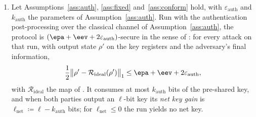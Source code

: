 \begin{corollary}
\begin{enumerate}[label=(\roman*),leftmargin=2.4em]
\item Let Assumptions~\ref{ass:auth}, \ref{ass:fixed}
  and~\ref{ass:conform} hold, with $\varepsilon_{\mathrm{auth}}$ and
  $k_{\mathrm{auth}}$ the parameters of Assumption~\ref{ass:auth}. Run with
  the authentication post-processing over the classical channel of
  Assumption~\ref{ass:auth}, the protocol is
  $(\epa+\eev+2\varepsilon_{\mathrm{auth}})$-secure in the sense of
  \cite[Sec.~3.3, Def.~3.8]{tupkary2026decoy}: for every attack on that run,
  with output state $\rho'$ on the key registers and the adversary's final
  information,
  \begin{equation}\label{eq:composed-auth}
    \frac12\big\|\rho'-\mathcal R_{\mathrm{ideal}}(\rho')\big\|_1
    \le\epa+\eev+2\varepsilon_{\mathrm{auth}},
  \end{equation}
  with $\mathcal R_{\mathrm{ideal}}$ the map of
  \cite[Sec.~3.3, Eqs.~(13)--(17)]{tupkary2026decoy}. It consumes at most
  $k_{\mathrm{auth}}$ bits of the pre-shared key, and when both parties
  output an $\ell$-bit key its \emph{net key gain} is
  $\ell_{\mathrm{net}}\coloneqq\ell-k_{\mathrm{auth}}$ bits; for
  $\ell_{\mathrm{net}}\le0$ the run yields no net key.
\end{enumerate}
\end{corollary}

